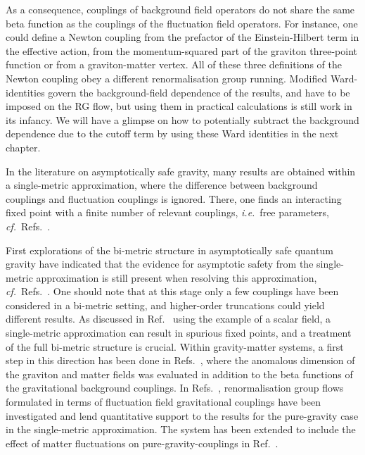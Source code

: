 \documentclass[11pt]{book}
\newcommand\ie{\textit{i.e.}\ }
\newcommand\cf{\textit{cf.}\ }
\numberwithin{equation}{chapter}
\begin{document}
As a consequence, couplings of background field operators
do not share the same beta function as the couplings of the fluctuation field operators.
For instance, one could define a Newton coupling from the prefactor of the Einstein-Hilbert term
in the effective action, from the momentum-squared part of the graviton three-point function or
from a graviton-matter vertex.
All of these three definitions of the Newton coupling obey a different renormalisation group running.
Modified Ward-identities govern the background-field dependence of the results,
and have to be imposed on the RG flow,
but using them in practical calculations is still work in its infancy.
We will have a glimpse on how to potentially subtract the background dependence
due to the cutoff term by using these Ward identities in the next chapter.

In the literature on asymptotically safe gravity, many results are obtained within a
single-metric approximation, where the difference between background couplings and fluctuation couplings
is ignored. There, one finds an interacting fixed point with a finite number of relevant couplings,
\ie free parameters, \cf Refs.~\cite{
  Reuter:1996cp, Dou:1997fg, Reuter:2001ag, Lauscher:2001ya, Lauscher:2002sq, Litim:2003vp,
  Fischer:2006fz, Machado:2007ea, Eichhorn:2009ah, Codello:2006in, Codello:2008vh,
  Benedetti:2009rx, Eichhorn:2010tb, Groh:2010ta, Manrique:2011jc, Rechenberger:2012dt, Benedetti:2012dx,
  Dietz:2012ic, Falls:2013bv, Benedetti:2013jk, Ohta:2013uca, Demmel:2014sga, Falls:2014tra, Falls:2015qga,
  Falls:2015cta, Gies:2015tca, Demmel:2015oqa
}.

First explorations of the bi-metric structure in asymptotically safe quantum gravity have indicated that the
evidence for asymptotic safety from the single-metric approximation is still present when
resolving this approximation, \cf Refs.~\cite{
  Manrique:2009uh, Manrique:2010mq, Manrique:2010am, Christiansen:2012rx, Codello:2013fpa,
  Christiansen:2014raa, Becker:2014qya, Christiansen:2015rva
}. One should note that at this stage only a few couplings have been considered in a bi-metric setting,
and higher-order truncations could yield different results.
As discussed in Ref.~\cite{Bridle:2013sra} using the example of a scalar field,
a single-metric approximation can result in spurious fixed points,
and a treatment of the full bi-metric structure is crucial.
Within gravity-matter systems, a first step in this direction has been done in
Refs.~\cite{Dona:2013qba, Dona:2014pla}, where the anomalous dimension of the graviton and matter
fields was evaluated in addition to the beta functions of the gravitational background couplings.
In Refs.~\cite{Christiansen:2014raa, Christiansen:2015rva},
renormalisation group flows formulated in terms of fluctuation field gravitational couplings have been
investigated and lend quantitative support to the results for the pure-gravity
case in the single-metric approximation. The system has been extended to include the effect
of matter fluctuations on pure-gravity-couplings in Ref.~\cite{Meibohm:2015twa}.
\end{document}
